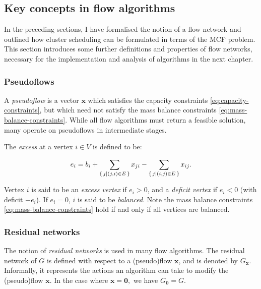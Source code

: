 \subsection{Key concepts in flow algorithms}


In the preceding sections, I have formalised the notion of a flow network and outlined how cluster scheduling can be formulated in terms of the MCF problem. This section introduces some further definitions and properties of flow networks, necessary for the implementation and analysis of algorithms in the next chapter.

\subsubsection{Pseudoflows} \label{sec:prep-flow-pseudo}


A \emph{pseudoflow} is a vector $\mathbf{x}$ which satisfies the capacity constraints
\cref{eq:capacity-constraints}, but which need not satisfy the mass balance constraints \cref{eq:mass-balance-constraints}. While all flow algorithms must return a feasible solution, many operate on pseudoflows in intermediate stages. 

The \emph{excess} at a vertex $i\in V$ is defined to be:

\begin{equation}
e_i=b_i+\sum_{\set{j | (j,i)\in E}}x_{ji}-\sum_{\set{j | (i,j)\in E}}x_{ij}.
\end{equation}

Vertex $i$ is said to be an \emph{excess vertex} if $e_{i}>0$, and a \emph{deficit vertex} if $e_{i}<0$ (with deficit $-e_{i}$). If $e_{i}=0$, $i$ is said to be \emph{balanced}. Note the mass balance constraints \cref{eq:mass-balance-constraints} hold if and only if all vertices are balanced.

\subsubsection{Residual networks}


The notion of \emph{residual networks} is used in many flow algorithms. The residual network of $G$ is defined with respect to a (pseudo)flow $\mathbf{x}$, and is denoted by $G_{\mathbf{x}}$. Informally, it represents the actions an algorithm can take to modify the (pseudo)flow $\mathbf{x}$. In the case where $\mathbf{x=0},$ we have $G_{\mathbf{0}}=G$.

